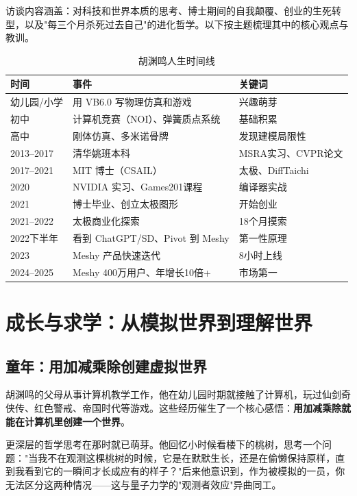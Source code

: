 \documentclass[a4paper]{article}
\begin{document}
访谈内容涵盖：对科技和世界本质的思考、博士期间的自我颠覆、创业的生死转型，以及"每三个月杀死过去自己"的进化哲学。以下按主题梳理其中的核心观点与教训。

\begin{table}[H]
\centering
\caption{胡渊鸣人生时间线}
\begin{tabular}{lll}
\toprule
\textbf{时间} & \textbf{事件} & \textbf{关键词} \\
\midrule
幼儿园/小学 & 用 VB6.0 写物理仿真和游戏 & 兴趣萌芽 \\
初中 & 计算机竞赛（NOI）、弹簧质点系统 & 基础积累 \\
高中 & 刚体仿真、多米诺骨牌 & 发现建模局限性 \\
2013--2017 & 清华姚班本科 & MSRA实习、CVPR论文 \\
2017--2021 & MIT 博士（CSAIL） & 太极、DiffTaichi \\
2020 & NVIDIA 实习、Games201课程 & 编译器实战 \\
2021 & 博士毕业、创立太极图形 & 开始创业 \\
2021--2022 & 太极商业化探索 & 18个月摸索 \\
2022下半年 & 看到 ChatGPT/SD、Pivot 到 Meshy & 第一性原理 \\
2023 & Meshy 产品快速迭代 & 8小时上线 \\
2024--2025 & Meshy 400万用户、年增长10倍+ & 市场第一 \\
\bottomrule
\end{tabular}
\end{table}

\section{成长与求学：从模拟世界到理解世界}

\subsection{童年：用加减乘除创建虚拟世界}

胡渊鸣的父母从事计算机教学工作，他在幼儿园时期就接触了计算机，玩过仙剑奇侠传、红色警戒、帝国时代等游戏。这些经历催生了一个核心感悟：\textbf{用加减乘除就能在计算机里创建一个世界}。

更深层的哲学思考在那时就已萌芽。他回忆小时候看楼下的桃树，思考一个问题："当我不在观测这棵桃树的时候，它是在默默生长，还是在偷懒保持原样，直到我看到它的一瞬间才长成应有的样子？"后来他意识到，作为被模拟的一员，你无法区分这两种情况——这与量子力学的"观测者效应"异曲同工。
\end{document}
